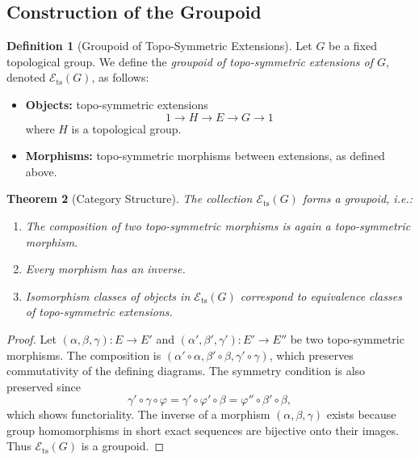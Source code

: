 \documentclass[11pt,a4paper]{article}
\theoremstyle{plain}
\newtheorem{theorem}{Theorem}[section]
\theoremstyle{definition}
\newtheorem{definition}[theorem]{Definition}
\theoremstyle{remark}
\begin{document}
	\subsection{Construction of the Groupoid}
	
	\begin{definition}[Groupoid of Topo-Symmetric Extensions]
		Let $G$ be a fixed topological group.  
		We define the \emph{groupoid of topo-symmetric extensions of $G$}, denoted $\mathcal{E}_{\mathrm{ts}}(G)$, as follows:
		\begin{itemize}
			\item \textbf{Objects:} topo-symmetric extensions
			\[
			1 \to H \to E \to G \to 1
			\]
			where $H$ is a topological group.
			\item \textbf{Morphisms:} topo-symmetric morphisms between extensions, as defined above.
		\end{itemize}
	\end{definition}
	
	\begin{theorem}[Category Structure]
		The collection $\mathcal{E}_{\mathrm{ts}}(G)$ forms a groupoid, i.e.:
		\begin{enumerate}
			\item The composition of two topo-symmetric morphisms is again a topo-symmetric morphism.  
			\item Every morphism has an inverse.  
			\item Isomorphism classes of objects in $\mathcal{E}_{\mathrm{ts}}(G)$ correspond to equivalence classes of topo-symmetric extensions.  
		\end{enumerate}
	\end{theorem}
	
	\begin{proof}
		Let $(\alpha,\beta,\gamma) : E \to E'$ and $(\alpha',\beta',\gamma') : E' \to E''$ be two topo-symmetric morphisms.  
		The composition is $(\alpha' \circ \alpha, \beta' \circ \beta, \gamma' \circ \gamma)$, which preserves commutativity of the defining diagrams.  
		The symmetry condition is also preserved since
		\[
		\gamma' \circ \gamma \circ \varphi = \gamma' \circ \varphi' \circ \beta = \varphi'' \circ \beta' \circ \beta,
		\]
		which shows functoriality.  
		The inverse of a morphism $(\alpha,\beta,\gamma)$ exists because group homomorphisms in short exact sequences are bijective onto their images.  
		Thus $\mathcal{E}_{\mathrm{ts}}(G)$ is a groupoid.  
	\end{proof}
	
\end{document}
